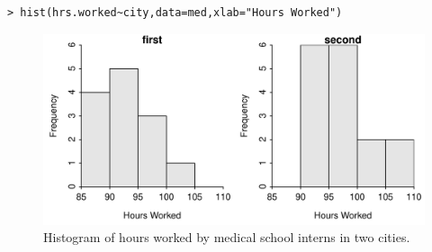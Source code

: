 \documentclass[10pt,openany]{book}\usepackage[]{graphicx}\usepackage[]{color}
\makeatletter
\newenvironment{kframe}{%
 \def\at@end@of@kframe{}%
 \ifinner\ifhmode%
  \def\at@end@of@kframe{\end{minipage}}%
  \begin{minipage}{\columnwidth}%
 \fi\fi%
 \def\FrameCommand##1{\hskip\@totalleftmargin \hskip-\fboxsep
 \colorbox{shadecolor}{##1}\hskip-\fboxsep
     \hskip-\linewidth \hskip-\@totalleftmargin \hskip\columnwidth}%
 \MakeFramed {\advance\hsize-\width
   \@totalleftmargin\z@ \linewidth\hsize
   \@setminipage}}%
 {\par\unskip\endMakeFramed%
 \at@end@of@kframe}
\newenvironment{knitrout}{}{} %
\makeatother
\begin{document}
\begin{itemize}
\begin{enumerate}
\begin{knitrout}
\color{fgcolor}\begin{kframe}
\begin{verbatim}
> hist(hrs.worked~city,data=med,xlab="Hours Worked")
\end{verbatim}
\end{kframe}\begin{figure}[hbtp]

{\centering \includegraphics[width=.4\linewidth]{Figs/MedInternHrsHist-1} 

}

\caption[Histogram of hours worked by medical school interns in two cities]{Histogram of hours worked by medical school interns in two cities.}\label{fig:MedInternHrsHist}
\end{figure}


\end{knitrout}



\end{enumerate}
\end{itemize}
\end{document}
